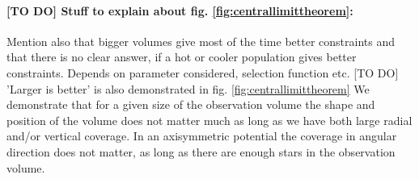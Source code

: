  \paragraph{[TO DO] Stuff to explain about fig. \ref{fig:centrallimittheorem}:} Mention also that bigger volumes give most of the time better constraints and that there is no clear answer, if a hot or cooler population gives better constraints. Depends on parameter considered, selection function etc.
[TO DO] 'Larger is better' is also demonstrated in fig. \ref{fig:centrallimittheorem}
We demonstrate that for a given size of the observation volume the shape and position of the volume does not matter much as long as we have both large radial and/or vertical coverage. 
In an axisymmetric potential the coverage in angular direction does not matter, as long as there are enough stars in the observation volume.


